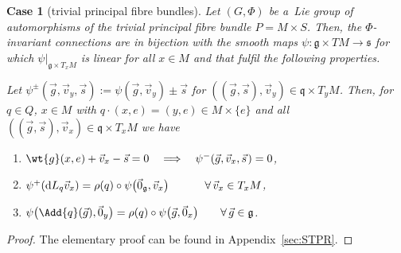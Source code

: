 \documentclass[pdftex]{sigma}
\numberwithin{equation}{section}
\newtheorem{scase}[Theorem]{Case}
{\theoremstyle{definition}
\newtheorem{Definition}[Theorem]{Definition}
\newtheorem{Convention}[Theorem]{Convention}
\newtheorem{Example}[Theorem]{Example}
\newtheorem{Remark}[Theorem]{Remark}
}
\begin{document}
\begin{scase}[trivial principal f\/ibre bundles]\label{scase:trivbundle}
Let $(G,\Phi)$ be a~Lie group of automorphisms of the trivial principal fibre bundle $P=M\times S$.
Then, the $\Phi$-invariant connections are in bijection with the smooth maps $\psi\colon \mathfrak{g}\times TM\rightarrow
\mathfrak{s}$ for which $\psi|_{\mathfrak{g}\times T_xM}$ is linear for all $x\in M$ and that fulfil the following
properties.

Let $\psi^{\pm}\left(\vec{g},\vec{v}_y,\vec{s}\right):=\psi\left(\vec{g},\vec{v}_y\right)\pm\vec{s}$ for
$((\vec{g},\vec{s}),\vec{v}_y)\in \mathfrak{q}\times T_yM$.
Then, for $q\in Q$, $x\in M$ with $q\cdot (x,e)=(y,e)\in M\times \{e\}$ and all $((\vec{g},\vec{s}),\vec{v}_x)\in
\mathfrak{q}\times T_xM$ we have
\begin{enumerate}\itemsep=0pt
\item[\rm i)] $\wt{g}(x,e) + \vec{v}_x -\vec{s}=0
\quad
\Longrightarrow
\quad
\psi^{-}(\vec{g},\vec{v}_x,\vec{s}\hspace{1pt})=0$,
\item[\rm ii)]
$\psi^+(\mathrm{d} L_q \vec{v}_x)=\rho(q)\circ
\psi\big(\vec{0}_{\mathfrak{g}},\vec{v}_x\big)\hspace*{11.4mm}\forall\, \vec{v}_x\in T_xM$,
\item[\rm iii)]
$\psi\big(\Add{q}(\vec{g}),\vec{0}_{y}\big)=\rho(q)\circ \psi\big(\vec{g},\vec{0}_{x}\big) \qquad\forall\, \vec{g}\in\mathfrak{g}$.
\end{enumerate}
\end{scase}

\begin{proof}
The elementary proof can be found in Appendix~\ref{sec:STPR}.
\end{proof}
\end{document}
